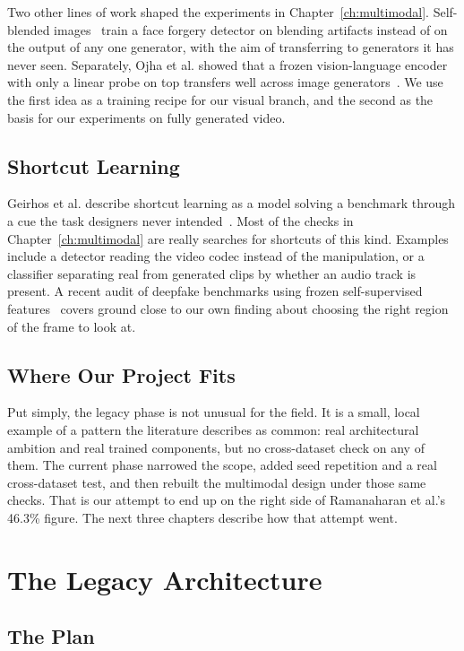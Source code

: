 Two other lines of work shaped the experiments in Chapter~\ref{ch:multimodal}.
Self-blended images~\cite{sbi} train a face forgery detector on blending
artifacts instead of on the output of any one generator, with the aim of
transferring to generators it has never seen. Separately, Ojha et al. showed
that a frozen vision-language encoder with only a linear probe on top transfers
well across image generators~\cite{univfd}. We use the first idea as a training
recipe for our visual branch, and the second as the basis for our experiments
on fully generated video.

\section{Shortcut Learning}

Geirhos et al. describe shortcut learning as a model solving a benchmark
through a cue the task designers never intended~\cite{shortcut}. Most of the
checks in Chapter~\ref{ch:multimodal} are really searches for shortcuts of this
kind. Examples include a detector reading the video codec instead of the
manipulation, or a classifier separating real from generated clips by whether
an audio track is present. A recent audit of deepfake benchmarks using frozen
self-supervised features~\cite{audit} covers ground close to our own finding
about choosing the right region of the frame to look at.

\section{Where Our Project Fits}

Put simply, the legacy phase is not unusual for the field. It is a small, local
example of a pattern the literature describes as common: real architectural
ambition and real trained components, but no cross-dataset check on any of
them. The current phase narrowed the scope, added seed repetition and a real
cross-dataset test, and then rebuilt the multimodal design under those same
checks. That is our attempt to end up on the right side of Ramanaharan et al.'s
46.3\% figure. The next three chapters describe how that attempt went.

\chapter{The Legacy Architecture}
\label{ch:legacy}

\section{The Plan}

